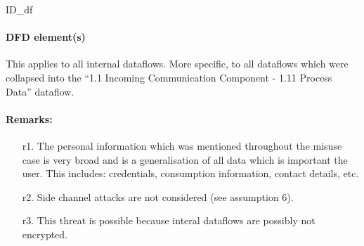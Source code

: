 ID\_df

\paragraph{DFD element(s)}

This applies to all internal dataflows. More specific, to all dataflows which
were collapsed into the ``1.1 Incoming Communication Component - 1.11 Process
Data'' dataflow.

\paragraph{Remarks:}
	\begin{enumerate}
         \item[r1.] The personal information which was mentioned throughout the
         misuse case is very broad and is a generalisation of all data which is
         important the user. This includes: credentials, consumption
         information, contact details, etc.
         \item[r2.] Side channel attacks are not considered (see assumption 6).
         \item[r3.] This threat is possible because interal dataflows are
         possibly not encrypted.
    \end{enumerate}

